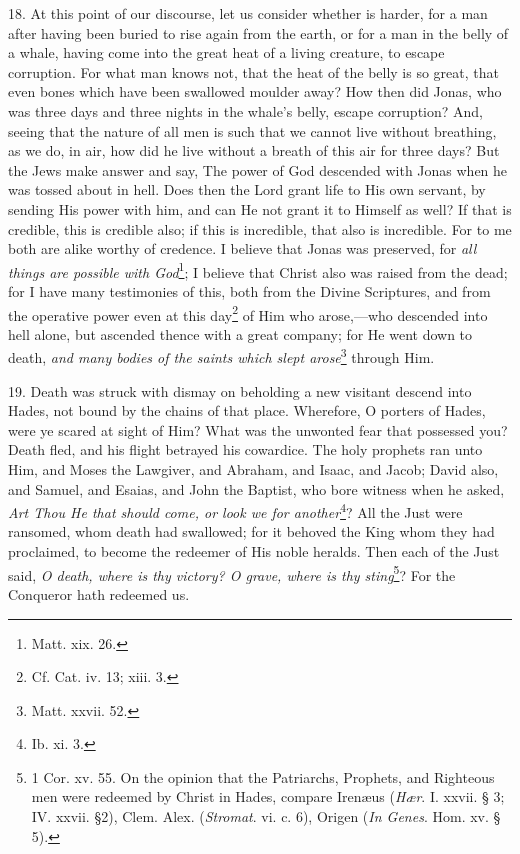 18. At this point of our discourse, let us consider whether is harder, for a man after having been buried to rise again from the earth, or for a man in the belly of a whale, having come into the great heat of a living creature, to escape corruption. For what man knows not, that the heat of the belly is so great, that even bones which have been swallowed moulder away? How then did Jonas, who was three days and three nights in the whale’s belly, escape corruption? And, seeing that the nature of all men is such that we cannot live without breathing, as we do, in air, how did he live without a breath of this air for three days? But the Jews make answer and say, The power of God descended with Jonas when he was tossed about in hell. Does then the Lord grant life to His own servant, by sending His power with him, and can He not grant it to Himself as well? If that is credible, this is credible also; if this is incredible, that also is incredible. For to me both are alike worthy of credence. I believe that Jonas was preserved, for \emph{all things are possible with God}\footnote{Matt. xix. 26.}; I believe that Christ also was raised from the dead; for I have many testimonies of this, both from the Divine Scriptures, and from the operative power even at this day\footnote{Cf. Cat. iv. 13; xiii. 3.} of Him who arose,—who descended into hell alone, but ascended thence with a great company; for He went down to death, \emph{and many bodies of the saints which slept arose}\footnote{Matt. xxvii. 52.} through Him.

19. Death was struck with dismay on beholding a new visitant descend into Hades, not bound by the chains of that place. Wherefore, O porters of Hades, were ye scared at sight of Him? What was the unwonted fear that possessed you? Death fled, and his flight betrayed his cowardice. The holy prophets ran unto Him, and Moses the Lawgiver, and Abraham, and Isaac, and Jacob; David also, and Samuel, and Esaias, and John the Baptist, who bore witness when he asked, \emph{Art Thou He that should come, or look we for another}\footnote{Ib. xi. 3.}? All the Just were ransomed, whom death had swallowed; for it behoved the King whom they had proclaimed, to become the redeemer of His noble heralds. Then each of the Just said, \emph{O death, where is thy victory? O grave, where is thy sting}\footnote{1 Cor. xv. 55. On the opinion that the Patriarchs, Prophets, and Righteous men were redeemed by Christ in Hades, compare Irenæus (\emph{Hær}. I. xxvii. § 3; IV. xxvii. §2), Clem. Alex. (\emph{Stromat}. vi. c. 6), Origen (\emph{In Genes}. Hom. xv. § 5).}? For the Conqueror hath redeemed us.

